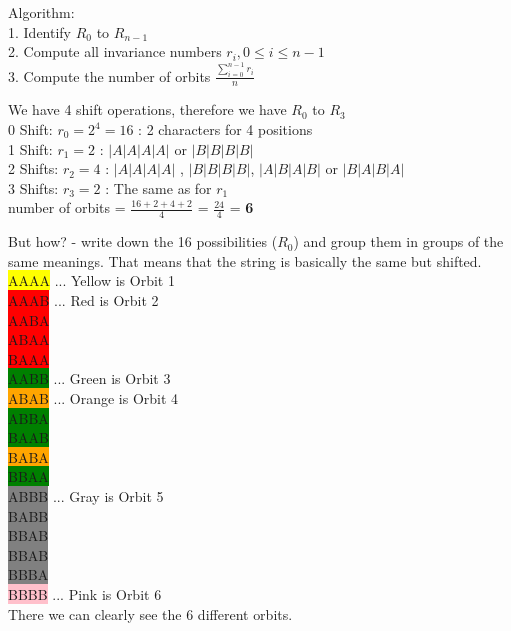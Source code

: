 \documentclass[12pt,onecolumn%
]{scrartcl}
\begin{document}
{Algorithm: \\
1. Identify $R_{0}$ to $R_{n-1}$ \\
2. Compute all invariance numbers $ r_{i},0 \leq i \leq n - 1$ \\
3. Compute the number of orbits $\frac{\sum \limits_{i = 0}^{n - 1} r_{i}}{n}$

We have 4 shift operations, therefore we have $R_{0}$ to $R_{3}$ \\
0 Shift: $r_{0} = 2^{4} = 16$ : 2 characters for 4 positions \\
1 Shift: $r_{1} = 2$ : $|A|A|A|A|$ or $|B|B|B|B|$ \\
2 Shifts: $r_{2} = 4$ : $|A|A|A|A|$ , $|B|B|B|B|$, $|A|B|A|B|$ or $|B|A|B|A|$ \\
3 Shifts: $r_{3} = 2$ : The same as for $r_{1}$ \\

number of orbits = $ \frac{16+2+4+2}{4}$ = $ \frac{24}{4} $ = \textbf{6}

But how? - write down the 16 possibilities ($R_{0}$) and group them in groups of the same meanings.
That means that the string is basically the same but shifted. \\

\colorbox{yellow}{AAAA} ... Yellow is Orbit 1\\
\colorbox{red}{AAAB} ... Red is Orbit 2\\
\colorbox{red}{AABA} \\
\colorbox{red}{ABAA} \\
\colorbox{red}{BAAA} \\
\colorbox{green}{AABB} ... Green is Orbit 3  \\
\colorbox{orange}{ABAB} ... Orange is Orbit 4\\
\colorbox{green}{ABBA} \\
\colorbox{green}{BAAB} \\
\colorbox{orange}{BABA} \\
\colorbox{green}{BBAA} \\
\colorbox{gray}{ABBB} ... Gray is Orbit 5\\
\colorbox{gray}{BABB} \\
\colorbox{gray}{BBAB} \\
\colorbox{gray}{BBAB} \\
\colorbox{gray}{BBBA} \\
\colorbox{pink}{BBBB} ... Pink is Orbit 6 \\

There we can clearly see the 6 different orbits.

}
\end{document}
